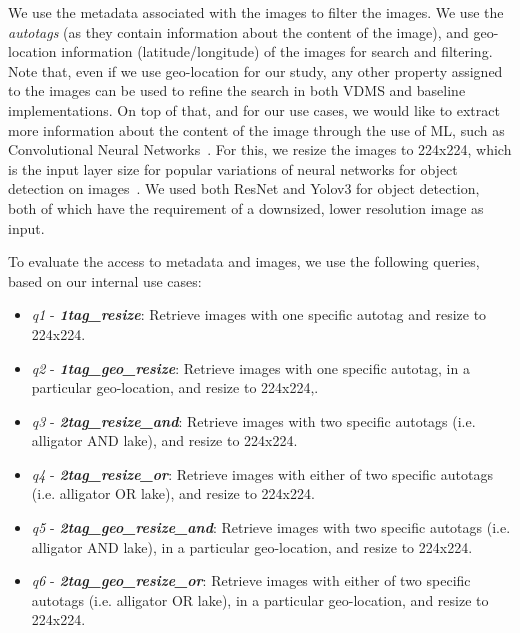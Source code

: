 We use the metadata associated with the images to filter the images.
We use the \textit{autotags} (as they contain information about the content
of the image), and geo-location information (latitude/longitude)
of the images for search and filtering.
Note that, even if we use geo-location for our study, any other property
assigned to the images can be used to refine the search
in both VDMS and baseline implementations.
On top of that, and for our use cases, we would like to extract more information
about the content of the image through the use of ML,
such as Convolutional Neural Networks~\cite{cnn}.
For this, we resize the images to 224x224, which is the input layer size for
popular variations of neural networks for object detection on images~\cite{resnet}.
We used both ResNet and Yolov3 for object detection, both of which
have the requirement of a downsized, lower resolution image as input.

To evaluate the access to metadata and images,
we use the following queries, based on our internal use cases:

\begin{itemize}
\item \textit{q1} - {\bf {\em 1tag\_resize}}: Retrieve images with one specific autotag and resize to 224x224.

\item \textit{q2} - {\bf {\em 1tag\_geo\_resize}}: Retrieve images with one specific autotag, in a particular geo-location, and resize to 224x224,.

\item \textit{q3} - {\bf {\em 2tag\_resize\_and}}: Retrieve images with two specific autotags (i.e. alligator AND lake), and resize to 224x224.

\item \textit{q4} - {\bf {\em 2tag\_resize\_or}}: Retrieve images with either of two specific autotags (i.e. alligator OR lake), and resize to 224x224.

\item \textit{q5} - {\bf {\em 2tag\_geo\_resize\_and}}: Retrieve images with two specific autotags (i.e. alligator AND lake), in a particular geo-location, and resize to 224x224.

\item \textit{q6} - {\bf {\em 2tag\_geo\_resize\_or}}: Retrieve images with either of two specific autotags (i.e. alligator OR lake), in a particular geo-location, and resize to 224x224.

\end{itemize}

